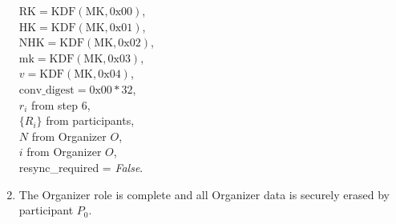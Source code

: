 \documentclass[%
preprint,
amsmath,amssymb,
aps,
prb,
floatfix,
]{revtex4-1}
\begin{document}
\begin{enumerate}
$\mathrm{RK} = \mathrm{KDF}(\mathrm{MK}, 0\mathrm{x}00)$, \\
$\mathrm{HK} = \mathrm{KDF}(\mathrm{MK}, 0\mathrm{x}01)$, \\
$\mathrm{NHK} = \mathrm{KDF}(\mathrm{MK}, 0\mathrm{x}02)$, \\
$\mathrm{mk} = \mathrm{KDF}(\mathrm{MK}, 0\mathrm{x}03)$, \\
$v = \mathrm{KDF}(\mathrm{MK}, 0\mathrm{x}04)$, \\
$\mathrm{conv\_digest} = 0\mathrm{x}00 * 32$, \\
$r_i$ from step 6, \\
$\{R_i\}$ from participants, \\
$N$ from Organizer $O$, \\
$i$ from Organizer $O$, \\
resync\_required = \textit{False}.
\item The Organizer role is complete and all Organizer data
is securely erased by participant $P_0$.
\end{enumerate}
\end{document}
